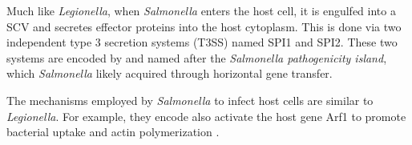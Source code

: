 Much like \textit{Legionella}, when \textit{Salmonella} enters the host cell, it is engulfed into a \acrfull{SCV}  and secretes effector proteins into the host cytoplasm. This is done via two independent type 3 secretion systems (T3SS) named SPI1 and SPI2. These two systems are encoded by and named after the \textit{Salmonella pathogenicity island}, which \textit{Salmonella} likely acquired through horizontal gene transfer.

The mechanisms employed by \textit{Salmonella} to infect host cells are similar to \textit{Legionella}. For example, they encode also activate the host gene Arf1 to promote bacterial uptake and actin polymerization \cite{Larock2015}.